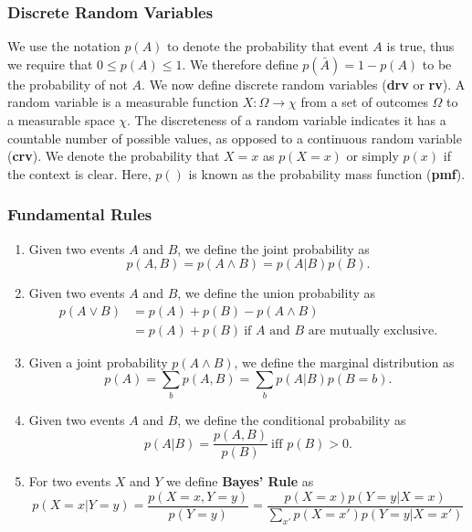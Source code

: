 \documentclass[10pt,a4paper]{article}
\numberwithin{equation}{section}
\theoremstyle{plain}
\theoremstyle{own}
\begin{document}
\subsubsection{Discrete Random Variables}
We use the notation $p(A)$ to denote the probability that event $A$ is true, thus we require that $0 \leq p(A) \leq 1$. We therefore define $p(\bar{A}) = 1 - p(A)$ to be the probability of not $A$. We now define discrete random variables (\textbf{drv} or \textbf{rv}). A random variable is a measurable function $X : \Omega \to \chi$ from a set of outcomes $\Omega$ to a measurable space $\chi$. The discreteness of a random variable indicates it has a countable number of possible values, as opposed to a continuous random variable (\textbf{crv}). We denote the probability that $X = x$ as $p(X = x)$ or simply $p(x)$ if the context is clear. Here, $p()$ is known as the probability mass function (\textbf{pmf}).
\subsubsection{Fundamental Rules}
\begin{enumerate}
\item Given two events $A$ and $B$, we define the joint probability as
\begin{equation}
p(A,B) = p(A \wedge B) = p(A|B)p(B).
\end{equation}
\item Given two events $A$ and $B$, we define the union probability as
\begin{align}
p(A \vee B) & = p(A) + p(B) - p(A \wedge B) \\
& = p(A) + p(B)~\text{if $A$ and $B$ are mutually exclusive}.
\end{align}
\item Given a joint probability $p(A \wedge B)$, we define the marginal distribution as
\begin{equation}
p(A) = \sum_{b} p(A, B) = \sum_b p(A|B)p(B = b).
\end{equation}
\item Given two events $A$ and $B$, we define the conditional probability as
\begin{equation}
p(A|B) = \frac{p(A,B)}{p(B)}~\text{iff $p(B) > 0$}.
\end{equation}
\item For two events $X$ and $Y$ we define \textbf{Bayes' Rule} as
\begin{equation}
p(X = x | Y = y) = \frac{p(X = x, Y = y)}{p(Y = y)} = \frac{p(X = x)p(Y = y | X = x)}{\sum_{x'} p(X = x')p(Y = y | X = x')}
\end{equation}
\end{enumerate}
\end{document}
